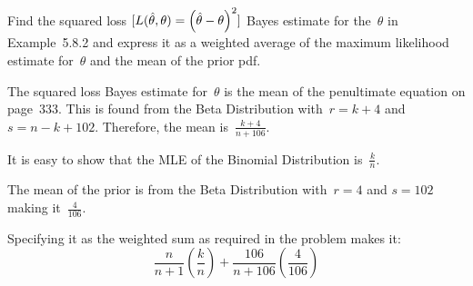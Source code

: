 \begin{problem}
   Find the squared loss ${\lbrack L(\hat{\theta},\theta) = \left(\hat{\theta} - \theta\right)^2\rbrack}$ Bayes estimate for the~$\theta$ in Example~5.8.2 and express it as a weighted average of the maximum likelihood estimate for~$\theta$ and the mean of the prior pdf.
\end{problem}

The squared loss Bayes estimate for~$\theta$ is the mean of the penultimate equation on page~333.  This is found from the Beta Distribution with~${r = k + 4}$ and~${s = n - k + 102}$.  Therefore, the mean is~$\frac{k+4}{n+106}$.

\noindent
It is easy to show that the MLE of the Binomial Distribution is~${\frac{k}{n}}$.

\noindent
The mean of the prior is from the Beta Distribution with~${r=4}$ and ${s=102}$ making it~${\frac{4}{106}}$.

\noindent
Specifying it as the weighted sum as required in the problem makes it:
\begin{equation}
  \boxed{\frac{n}{n+1}\left(\frac{k}{n}\right) + \frac{106}{n + 106} \left(\frac{4}{106}\right)}
\end{equation}
